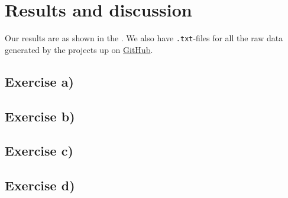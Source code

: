 \documentclass{article}
\begin{document}
\vspace{1cm}

\section{Results and discussion} \label{sec:Results}

  Our results are as shown in the . We also have \texttt{.txt}-files for all the raw data generated by the projects up on \href{https://github.com/Erikbgram/Fys3150}{GitHub}. \\

  \subsection{Exercise a)} \label{sec:Results a)}



  \subsection{Exercise b)} \label{sec:Results b)}



  \subsection{Exercise c)} \label{sec:Results c)}









  \subsection{Exercise d)} \label{sec:Results d)}
\end{document}
